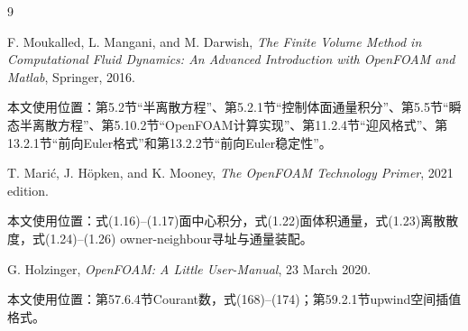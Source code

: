 \documentclass[UTF8,12pt,a4paper]{ctexart}
\numberwithin{equation}{section}
\begin{document}
\newpage
\begin{thebibliography}{9}

F. Moukalled, L. Mangani, and M. Darwish,
\textit{The Finite Volume Method in Computational Fluid Dynamics: An Advanced Introduction with OpenFOAM and Matlab},
Springer, 2016.

本文使用位置：第5.2节“半离散方程”、第5.2.1节“控制体面通量积分”、第5.5节“瞬态半离散方程”、第5.10.2节“OpenFOAM计算实现”、第11.2.4节“迎风格式”、第13.2.1节“前向Euler格式”和第13.2.2节“前向Euler稳定性”。

T. Mari\'{c}, J. H\"opken, and K. Mooney,
\textit{The OpenFOAM Technology Primer}, 2021 edition.

本文使用位置：式(1.16)--(1.17)面中心积分，式(1.22)面体积通量，式(1.23)离散散度，式(1.24)--(1.26) owner-neighbour寻址与通量装配。

G. Holzinger,
\textit{OpenFOAM: A Little User-Manual},
23 March 2020.

本文使用位置：第57.6.4节Courant数，式(168)--(174)；第59.2.1节upwind空间插值格式。

\end{thebibliography}
\end{document}
